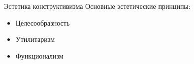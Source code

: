 \begin{frame}{Эстетика конструктивизма}
    Основные эстетические принципы:
    \begin{itemize}
        \item Целесообразность
        \item Утилитаризм
        \item Функционализм
    \end{itemize}
\end{frame}